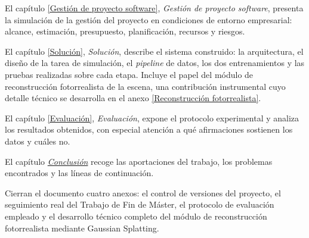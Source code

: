 El capítulo \ref{Gestión de proyecto software}, \textit{Gestión de proyecto software}, presenta la
simulación de la gestión del proyecto en condiciones de entorno empresarial: alcance, estimación,
presupuesto, planificación, recursos y riesgos.

El capítulo \ref{Solución}, \textit{Solución}, describe el sistema construido: la arquitectura, el
diseño de la tarea de simulación, el \textit{pipeline} de datos, los dos entrenamientos y las pruebas
realizadas sobre cada etapa. Incluye el papel del módulo de reconstrucción fotorrealista de la
escena, una contribución instrumental cuyo detalle técnico se desarrolla en el anexo
\ref{Reconstrucción fotorrealista}.

El capítulo \ref{Evaluación}, \textit{Evaluación}, expone el protocolo experimental y analiza los
resultados obtenidos, con especial atención a qué afirmaciones sostienen los datos y cuáles no.

El capítulo \hyperref[Conclusión]{\textit{Conclusión}} recoge las aportaciones del trabajo, los problemas encontrados y
las líneas de continuación.

Cierran el documento cuatro anexos: el control de versiones del proyecto, el seguimiento real del
Trabajo de Fin de Máster, el protocolo de evaluación empleado y el desarrollo técnico completo del
módulo de reconstrucción fotorrealista mediante Gaussian Splatting.
